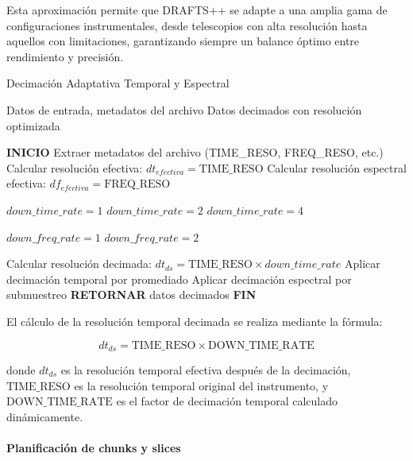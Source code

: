 Esta aproximación permite que DRAFTS++ se adapte a una amplia gama de configuraciones instrumentales, desde telescopios con alta resolución hasta aquellos con limitaciones, garantizando siempre un balance óptimo entre rendimiento y precisión.

\begin{algorithm}[H]
\caption{Decimación Adaptativa Temporal y Espectral}
\label{alg:adaptive-decimation}
\begin{algorithmic}[1]
\Require Datos de entrada, metadatos del archivo
\Ensure Datos decimados con resolución optimizada

\State \textbf{INICIO}
\State Extraer metadatos del archivo (TIME\_RESO, FREQ\_RESO, etc.)
\State Calcular resolución efectiva: $dt_{efectiva} = \text{TIME\_RESO}$
\State Calcular resolución espectral efectiva: $df_{efectiva} = \text{FREQ\_RESO}$

    \State $down\_time\_rate = 1$ 
    \State $down\_time\_rate = 2$ 
\Else
    \State $down\_time\_rate = 4$ 
\EndIf

    \State $down\_freq\_rate = 1$ 
\Else
    \State $down\_freq\_rate = 2$ 
\EndIf

\State Calcular resolución decimada: $dt_{ds} = \text{TIME\_RESO} \times down\_time\_rate$
\State Aplicar decimación temporal por promediado
\State Aplicar decimación espectral por submuestreo
\State \textbf{RETORNAR} datos decimados
\State \textbf{FIN}
\end{algorithmic}
\end{algorithm}

El cálculo de la resolución temporal decimada se realiza mediante la fórmula:

\[
dt_{ds} = \text{TIME\_RESO} \times \text{DOWN\_TIME\_RATE}
\]

donde $dt_{ds}$ es la resolución temporal efectiva después de la decimación, $\text{TIME\_RESO}$ es la resolución temporal original del instrumento, y $\text{DOWN\_TIME\_RATE}$ es el factor de decimación temporal calculado dinámicamente.

\paragraph{Planificación de chunks y slices}\label{sec:chunk-slice-planning}

